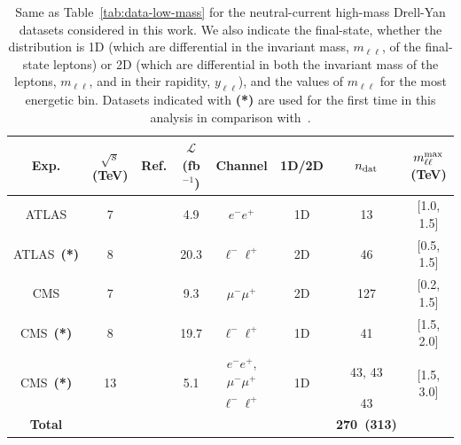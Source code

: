 \documentclass[withindex,glossary]{cam-thesis}
\begin{document}

\begin{table}[t]
  \renewcommand{\arraystretch}{1.20}
\begin{center}
\small
\begin{tabular}{cccccccc}
 \toprule
 Exp.   & $\sqrt{s}$ (TeV) & Ref. & $\mathcal{L}$ (fb$^{-1}$) & Channel & 1D/2D & $n_{\rm dat}$ & $m_{\ell\ell}^{\rm max}$ (TeV) \\
 \midrule
 ATLAS  & 7    & \cite{Aad:2013iua}         & 4.9   & $e^{-}e^{+}$									& 1D & 13 & [1.0, 1.5] \\
 ATLAS~{\bf (*)}  & 8    & \cite{Aad:2016zzw}         & 20.3  & $\ell^{-}\ell^{+}$									& 2D & 46 & [0.5, 1.5] \\
 \midrule
 CMS    & 7    & \cite{Chatrchyan:2013tia}  & 9.3   & $\mu^{-}\mu^{+}$								& 2D & 127 & [0.2, 1.5] \\
 CMS~{\bf (*)}    & 8    & \cite{CMS:2014jea}         & 19.7  & $\ell^{-}\ell^{+}$									& 1D & 41 & [1.5, 2.0] \\
  \midrule
 \multirow{2}{*}{ CMS~{\bf (*)}}    & \multirow{2}{*}{13}   & \multirow{2}{*}{\cite{Sirunyan:2018owv}}    & \multirow{2}{*}{5.1}   & $e^{-}e^{+}$, $\mu^{-}\mu^{+}$	& \multirow{2}{*}{1D} & 43, 43 & \multirow{2}{*}{[1.5, 3.0]} \\
 &  &   &    &   $\ell^{-}\ell^{+}$  &    & 43    &   \\
 \midrule
 {\bf Total}  &  &     &     &     &  & {\bf 270~(313)} \\
 \bottomrule
\end{tabular}
\end{center}
\caption{\small Same as Table~\ref{tab:data-low-mass} for the neutral-current high-mass Drell-Yan datasets
  considered in this work.
  We also indicate the final-state, whether the distribution is 1D (which are differential in 
the invariant mass, $m_{\ell\ell}$, of the final-state leptons) or 2D (which are differential in both the invariant mass of the 
leptons, $m_{\ell\ell}$, and in their rapidity, $y_{\ell\ell}$), and the values
  of $m_{\ell\ell}$ for the most energetic bin.
  Datasets indicated with {\bf (*)} are used for the first time in this analysis
  in comparison with~\cite{Faura:2020oom}.
}
\label{tab:data-high-mass}
\end{table}
\end{document}
